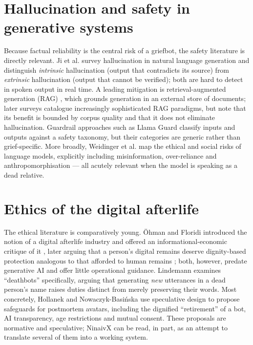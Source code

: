 \documentclass[11pt,a4paper]{report}
\begin{document}
\section{Hallucination and safety in generative systems}
Because factual reliability is the central risk of a griefbot, the safety literature is directly relevant. Ji et al. \cite{ji2023survey} survey hallucination in natural language generation and distinguish \emph{intrinsic} hallucination (output that contradicts its source) from \emph{extrinsic} hallucination (output that cannot be verified); both are hard to detect in spoken output in real time. A leading mitigation is retrieval-augmented generation (RAG) \cite{lewis2020retrieval}, which grounds generation in an external store of documents; later surveys \cite{gao2023retrieval} catalogue increasingly sophisticated RAG paradigms, but note that its benefit is bounded by corpus quality and that it does not eliminate hallucination. Guardrail approaches such as Llama Guard \cite{inan2023llama} classify inputs and outputs against a safety taxonomy, but their categories are generic rather than grief-specific. More broadly, Weidinger et al. \cite{weidinger2021risks} map the ethical and social risks of language models, explicitly including misinformation, over-reliance and anthropomorphisation --- all acutely relevant when the model is speaking as a dead relative.

\section{Ethics of the digital afterlife}
The ethical literature is comparatively young. \"Ohman and Floridi introduced the notion of a digital afterlife industry and offered an informational-economic critique of it \cite{ohman2017political}, later arguing that a person's digital remains deserve dignity-based protection analogous to that afforded to human remains \cite{ohman2018ethical}; both, however, predate generative AI and offer little operational guidance. Lindemann \cite{lindemann2022deathbots} examines ``deathbots'' specifically, arguing that generating \emph{new} utterances in a dead person's name raises duties distinct from merely preserving their words. Most concretely, Hollanek and Nowaczyk-Basi\'nska \cite{hollanek2024griefbots} use speculative design to propose safeguards for postmortem avatars, including the dignified ``retirement'' of a bot, AI transparency, age restrictions and mutual consent. These proposals are normative and speculative; NinaivX can be read, in part, as an attempt to translate several of them into a working system.
\end{document}
